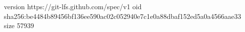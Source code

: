 version https://git-lfs.github.com/spec/v1
oid sha256:be4484b89456bf136ee590ac02c052940e7c1e0a88dbaf152ed5a0a4566aae33
size 57939
